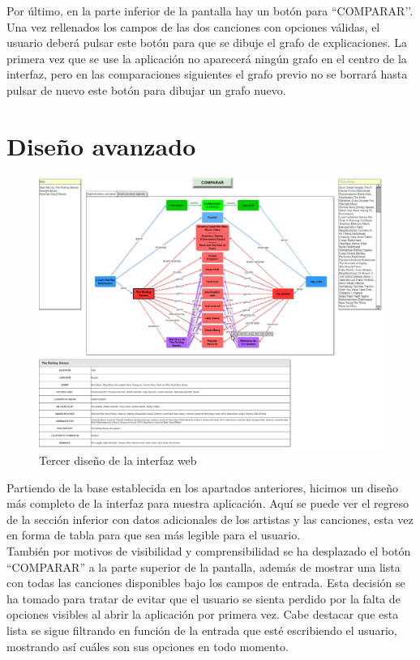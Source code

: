 Por último, en la parte inferior de la pantalla hay un botón para ``COMPARAR’’. Una vez rellenados los campos de las dos canciones con opciones válidas, el usuario deberá pulsar este botón para que se dibuje el grafo de explicaciones. La primera vez que se use la aplicación no aparecerá ningún grafo en el centro de la interfaz, pero en las comparaciones siguientes el grafo previo no se borrará hasta pulsar de nuevo este botón para dibujar un grafo nuevo.\\

\section{Diseño avanzado}

\begin{figure}[h!]
	\centering
	\includegraphics[width = 1\textwidth]{Imagenes/Bitmap/Tercera Interfaz.png}
	\caption{Tercer diseño de la interfaz web}
	\label{fig:sampleImage}
\end{figure}

Partiendo de la base establecida en los apartados anteriores, hicimos un diseño más completo de la interfaz para nuestra aplicación. Aquí se puede ver el regreso de la sección inferior con datos adicionales de los artistas y las canciones, esta vez en forma de tabla para que sea más legible para el usuario.\\

También por motivos de visibilidad y comprensibilidad se ha desplazado el botón ``COMPARAR'' a la parte superior de la pantalla, además de mostrar una lista con todas las canciones disponibles bajo los campos de entrada. Esta decisión se ha tomado para tratar de evitar que el usuario se sienta perdido por la falta de opciones visibles al abrir la aplicación por primera vez. Cabe destacar que esta lista se sigue filtrando en función de la entrada que esté escribiendo el usuario, mostrando así cuáles son sus opciones en todo momento.\\

